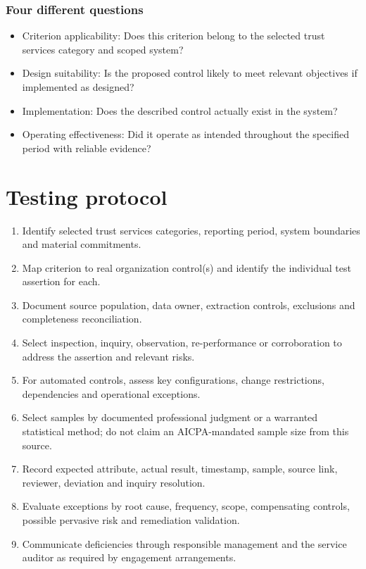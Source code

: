 \documentclass[10pt,oneside]{report}
\begin{document}
\subsection{Four different questions}
\begin{itemize}
\item Criterion applicability: Does this criterion belong to the selected trust services category and scoped system?
\item Design suitability: Is the proposed control likely to meet relevant objectives if implemented as designed?
\item Implementation: Does the described control actually exist in the system?
\item Operating effectiveness: Did it operate as intended throughout the specified period with reliable evidence?
\end{itemize}

\chapter{Testing protocol}
\begin{enumerate}
\item Identify selected trust services categories, reporting period, system boundaries and material commitments.
\item Map criterion to real organization control(s) and identify the individual test assertion for each.
\item Document source population, data owner, extraction controls, exclusions and completeness reconciliation.
\item Select inspection, inquiry, observation, re-performance or corroboration to address the assertion and relevant risks.
\item For automated controls, assess key configurations, change restrictions, dependencies and operational exceptions.
\item Select samples by documented professional judgment or a warranted statistical method; do not claim an AICPA-mandated sample size from this source.
\item Record expected attribute, actual result, timestamp, sample, source link, reviewer, deviation and inquiry resolution.
\item Evaluate exceptions by root cause, frequency, scope, compensating controls, possible pervasive risk and remediation validation.
\item Communicate deficiencies through responsible management and the service auditor as required by engagement arrangements.
\end{enumerate}
\end{document}
